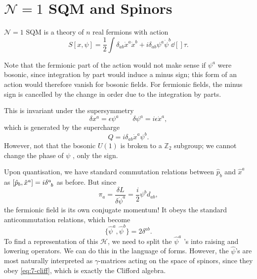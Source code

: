 \section{\texorpdfstring{$\mathcal{N} = 1$}{One-dimensional} SQM and Spinors }%
\label{sec:$n = 1$_one_dimensional_sqm_and_spinors_}

$\mathcal{N} = 1$ SQM is a theory of $n$ real fermions with action
\begin{equation}
  S[x, \psi] = \frac{1}{2} \int \delta_{ab} \dot{x}^{a} \dot{x}^{b} + i \delta_{ab} \psi^{a} \dot{\psi}^{b} \dd[]{\tau}.
\end{equation}
\begin{remark}
  Note that the fermionic part of the action would not make sense if $\psi^{a}$ were bosonic, since integration by part would induce a minus sign; this form of an action would therefore vanish for bosonic fields.
  For fermionic fields, the minus sign is cancelled by the change in order due to the integration by parts.
\end{remark}
This is invariant under the supersymmetry
\begin{equation}
  \label{eq:n1susy}
  \delta x^{a} = \epsilon \psi^{a} \qquad \delta\psi^{a} = i \epsilon \dot{x}^{a},
\end{equation}
which is generated by the supercharge
\begin{equation}
  Q = i \delta_{ab} \dot{x}^{a} \psi^{b}.
\end{equation}
However, not that the bosonic $U(1)$  is broken to a $\mathbb{Z}_2$  subgroup; we cannot change the phase of $\psi$ , only the sign.

Upon quantisation, we have standard commutation relations between $\hat{p}_{b}$  and $\hat{x}^{a}$  as $[\hat{p}_b, \hat{x}^{a}] = i \delta\indices{^{a}_{b}}$  as before. But since
\begin{equation}
  \pi_a = \frac{\delta L}{\delta \dot{\psi}^{a}} = \frac{i}{2} \psi^{b} d_{ab},
\end{equation} 
the fermionic field is its own conjugate momentum!
It obeys the standard anticommutation relations, which become
\begin{equation}
  \label{eq:7-cliff}
  \{\hat{\psi}^{a}, \hat{\psi}^{b}\} = 2 \delta^{ab}.
\end{equation}
To find a representation of this $\mathscr{H}$, we need to split the $\hat{\psi}^a$ 's into raising and lowering operators.
We can do this in the language of forms. However, the $\hat\psi$'s are most naturally interpreted as $\gamma$-matrices acting on the space of spinors, since they obey \eqref{eq:7-cliff}, which is exactly the Clifford algebra.

